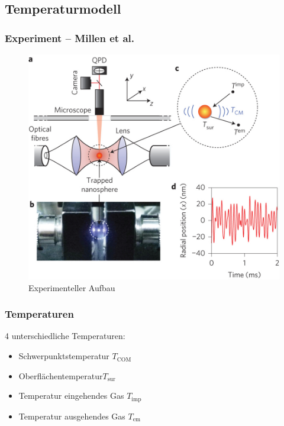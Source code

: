 \documentclass[handout]{beamer}
\begin{document}
\subsection{Temperaturmodell}
\begin{frame}
\frametitle{Experiment -- Millen et al.}
\begin{center}
\begin{figure}
\includegraphics[scale=0.2]{../images/nnano_millen.jpg}
\caption{Experimenteller Aufbau \cite{MillenJ.2014}}
\end{figure}
\end{center}
\end{frame}

\begin{frame}
\frametitle{Temperaturen}
4 unterschiedliche Temperaturen:
\begin{itemize}
\item Schwerpunktstemperatur $T_\text{COM}$
\item Oberflächentemperatur$T_\text{sur}$
\item Temperatur eingehendes Gas $T_\text{imp}$
\item Temperatur ausgehendes Gas $T_\text{em}$
\end{itemize}
\end{frame}
\end{document}
